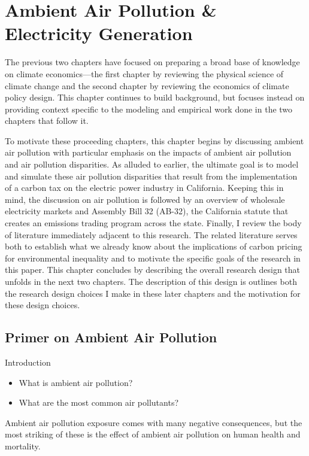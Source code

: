 \newpage
\section{Ambient Air Pollution \& Electricity Generation}

The previous two chapters have focused on preparing a broad base of knowledge on climate economics---the first chapter by reviewing the physical science of climate change and the second chapter by reviewing the economics of climate policy design. This chapter continues to build background, but focuses instead on providing context specific to the modeling and empirical work done in the two chapters that follow it. 

To motivate these proceeding chapters, this chapter begins by discussing ambient air pollution with particular emphasis on the impacts of ambient air pollution and air pollution disparities. As alluded to earlier, the ultimate goal is to model and simulate these air pollution disparities that result from the implementation of a carbon tax on the electric power industry in California. Keeping this in mind, the discussion on air pollution is followed by an overview of wholesale electricity markets and Assembly Bill 32 (AB-32), the California statute that creates an emissions trading program across the state. Finally, I review the body of literature immediately adjacent to this research. The related literature serves both to establish what we already know about the implications of carbon pricing for environmental inequality and to motivate the specific goals of the research in this paper. This chapter concludes by describing the overall research design that unfolds in the next two chapters. The description of this design is outlines both the research design choices I make in these later chapters and the motivation for these design choices. 

\subsection{Primer on Ambient Air Pollution}

\noindent Introduction
\begin{itemize}
    \item What is ambient air pollution? 
    \item What are the most common air pollutants?
\end{itemize}

Ambient air pollution exposure comes with many negative consequences, but the most striking of these is the effect of ambient air pollution on human health and mortality. 


